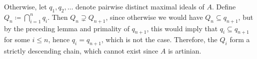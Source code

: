 Otherwise, let $q_1, q_2, \ldots$ denote pairwise distinct maximal ideals
of $A$. Define $Q_n\coloneqq \bigcap_{i=1}^n q_i$. Then
$Q_n \supsetneq Q_{n+1}$, since otherwise we would have $Q_n \subseteq q_{n+1}$, but
by the preceding lemma and primality of $q_{n+1}$, this would imply that
$q_i \subseteq q_{n+1}$ for some $i\leq n$, hence $q_i = q_{n+1}$, which is
not the case. Therefore, the $Q_i$ form a strictly descending chain, which cannot
exist since $A$ is artinian.
